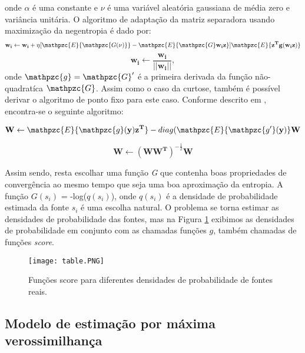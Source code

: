     onde $\alpha$ é uma constante e $\nu$ é uma variável aleatória gaussiana de média zero e variância unitária.  O algoritmo de adaptação da matriz separadora usando maximização da negentropia é dado por:
    \begin{equation}
          \mathbf{w_i} \leftarrow  \mathbf{w_i} + \eta[\mathpzc{E}\{\mathpzc{G(\nu)}\} - \mathpzc{E}\{\mathpzc{G}\mathbf{w_iz}\}]\mathpzc{E}\{\mathbf{z^Tg(w_iz)}\}
    \end{equation}
    \begin{equation}
          \mathbf{w_i} \leftarrow  \frac{\mathbf{w_i}}{||\mathbf{w_i}||},
    \end{equation}
    onde $\mathpzc{g} = \mathpzc{G}'$ é a primeira derivada da função não-quadratíca $\mathpzc{G}$.
    Assim como o caso da curtose, também é possível derivar o algoritmo de ponto fixo para este caso. Conforme descrito em \cite{LuizVictorio}, encontra-se o seguinte algoritmo:
    
    \begin{equation}
        \mathbf{W} \leftarrow \mathpzc{E}\{\mathpzc{g}\mathbf{(y)z^T}\} - diag(\mathpzc{E}\{\mathpzc{g'}\mathbf{(y)}\}\mathbf{W}
    \end{equation}
    
    \begin{equation}
        \mathbf{W} \leftarrow (\mathbf{WW^T})^{-\frac{1}{2}}\mathbf{W}
    \end{equation}
    
    
    Assim sendo, resta escolhar uma função \textit{G} que contenha boas propriedades de convergência ao mesmo tempo que seja uma boa aproximação da entropia. A função $G(s_i)$ = -log($q(s_i)$), onde $q(s_i)$ é a densidade de probabilidade estimada da fonte $s_i$ é uma escolha natural. O problema se torna estimar as densidades de probabilidade das fontes, mas na Figura \ref{fig:scoretable} exibimos as densidades de probabilidade em conjunto com as chamadas funções $g$, também chamadas de funções \textit{score}.
    
    \begin{figure}
        \centering
        \texttt{[image: table.PNG]}
        \caption{Funções score para diferentes densidades de probabilidade de fontes reais.}
        \label{fig:scoretable}
    \end{figure}
    
\subsection{Modelo de estimação por máxima verossimilhança}

